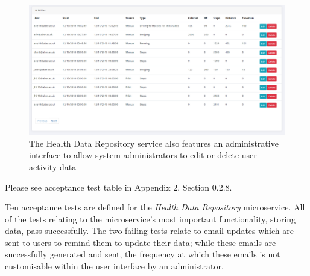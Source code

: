 \begin{figure}[H]
    \centering
    \includegraphics[width=\textwidth]{Images/service_health_data_repository.png}
    \caption{The Health Data Repository service also features an administrative interface to allow system administrators to edit or delete user activity data}
\end{figure}

Please see acceptance test table in Appendix 2, Section 0.2.8.

Ten acceptance tests are defined for the \textit{Health Data Repository} microservice. All of the tests relating to the microservice's most important functionality, storing data, pass successfully. The two failing tests relate to email updates which are sent to users to remind them to update their data; while these emails are successfully generated and sent, the frequency at which these emails is not customisable within the user interface by an administrator. 